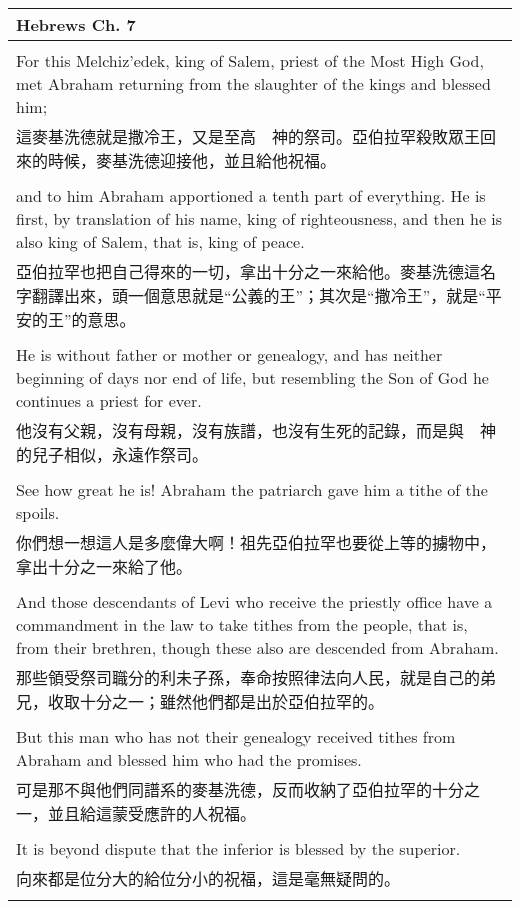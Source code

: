 \documentclass{book}
\begin{document}
\begin{tabularx}{\textwidth}{p{}}
\hline
Hebrews Ch. 7 \\
\hline \\
For this Melchiz'edek, king of Salem, priest of the Most High God, met Abraham returning from the slaughter of the kings and blessed him; \\
這麥基洗德就是撒冷王，又是至高　神的祭司。亞伯拉罕殺敗眾王回來的時候，麥基洗德迎接他，並且給他祝福。 \\ \\
and to him Abraham apportioned a tenth part of everything. He is first, by translation of his name, king of righteousness, and then he is also king of Salem, that is, king of peace. \\
亞伯拉罕也把自己得來的一切，拿出十分之一來給他。麥基洗德這名字翻譯出來，頭一個意思就是“公義的王”；其次是“撒冷王”，就是“平安的王”的意思。 \\ \\
He is without father or mother or genealogy, and has neither beginning of days nor end of life, but resembling the Son of God he continues a priest for ever. \\
他沒有父親，沒有母親，沒有族譜，也沒有生死的記錄，而是與　神的兒子相似，永遠作祭司。 \\ \\
See how great he is! Abraham the patriarch gave him a tithe of the spoils. \\
你們想一想這人是多麼偉大啊！祖先亞伯拉罕也要從上等的擄物中，拿出十分之一來給了他。 \\ \\
And those descendants of Levi who receive the priestly office have a commandment in the law to take tithes from the people, that is, from their brethren, though these also are descended from Abraham. \\
那些領受祭司職分的利未子孫，奉命按照律法向人民，就是自己的弟兄，收取十分之一；雖然他們都是出於亞伯拉罕的。 \\ \\
But this man who has not their genealogy received tithes from Abraham and blessed him who had the promises. \\
可是那不與他們同譜系的麥基洗德，反而收納了亞伯拉罕的十分之一，並且給這蒙受應許的人祝福。 \\ \\
It is beyond dispute that the inferior is blessed by the superior. \\
向來都是位分大的給位分小的祝福，這是毫無疑問的。 \\ \\

\end{tabularx}
\end{document}
